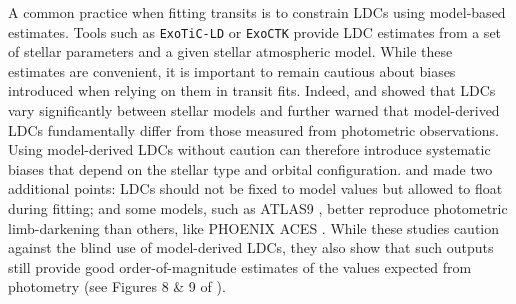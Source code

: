 \documentclass[twocolumn]{aastex631}
\newcommand{\vtwo}[1]{{#1}}
\begin{document}
A common practice when fitting transits is to constrain LDCs using model-based estimates. Tools such as \texttt{ExoTiC-LD} or \texttt{ExoCTK} \citep{ExoCTK} provide LDC estimates from a set of stellar parameters and a given stellar atmospheric model. While these estimates are convenient, it is important to remain cautious about biases introduced when relying on them in transit fits. Indeed,  and  showed that LDCs vary significantly between stellar models and \citet{Howarth2011} further warned that model-derived LDCs fundamentally differ from those measured from photometric observations. Using model-derived LDCs without caution can therefore introduce systematic biases that depend on the stellar type and orbital configuration.  and  made two additional points: LDCs should not be fixed to model values but allowed to float during fitting; and some models, such as ATLAS9 \citep{Kurucz1979}, better reproduce photometric limb-darkening than others, like PHOENIX ACES \citep{Husser2013}. While these studies caution against the blind use of model-derived LDCs, they also show that such outputs still provide good order-of-magnitude estimates \vtwo{of} the values expected from photometry (see Figures 8 \& 9 of ).
\end{document}
